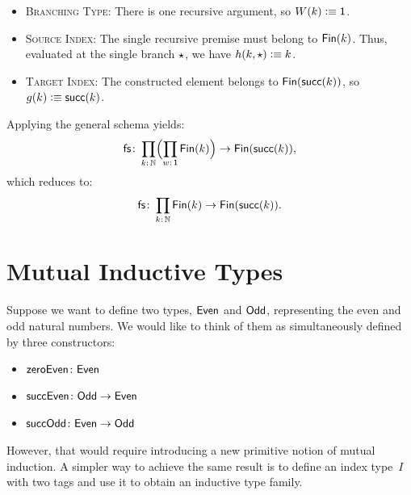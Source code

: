 \begin{xmpl}
\begin{enumerate}
\begin{itemize}
            \item \textsc{Branching Type:} There is one recursive argument, so $W(k)\mathrel{\vcentcolon}\equiv\mathsf{1}$.
            
            \item \textsc{Source Index:} The single recursive premise must belong to $\mathsf{Fin}(k)$. Thus, evaluated at the single branch ${\mathsf{\star}}$, we have $h(k,{\mathsf{\star}})\mathrel{\vcentcolon}\equiv k$.
            
            \item \textsc{Target Index:} The constructed element belongs to $\mathsf{Fin}(\mathsf{succ}(k))$, so $g(k)\mathrel{\vcentcolon}\equiv\mathsf{succ}(k)$.
        \end{itemize}
        Applying the general schema yields:
        \[
            \fun{fs}\colon \prod_{k\colon\N} \Bigl( \prod_{w\colon\fun1} \fun{Fin}(k) \Bigr) \to \fun{Fin}(\fun{succ}(k)),
        \]
        which reduces to:
        \[
            \fun{fs}\colon \prod_{k\colon\N} \fun{Fin}(k) \to \fun{Fin}(\fun{succ}(k)).
        \]
    \end{enumerate}
\end{xmpl}


\section{Mutual Inductive Types}

Suppose we want to define two types, $\mathsf{Even}$ and $\mathsf{Odd}$, representing the even and odd natural numbers. We would like to think of them as simultaneously defined by three constructors:
\begin{itemize}
    \item $\fun{zeroEven}\colon\fun{Even}$
    \item $\fun{succEven}\colon\fun{Odd}\to\fun{Even}$
    \item $\fun{succOdd}\colon\fun{Even}\to\fun{Odd}$
\end{itemize}
However, that would require introducing a new primitive notion of mutual induction. A simpler way to achieve the same result is to define an index type~$I$ with two tags and use it to obtain an inductive type family.

